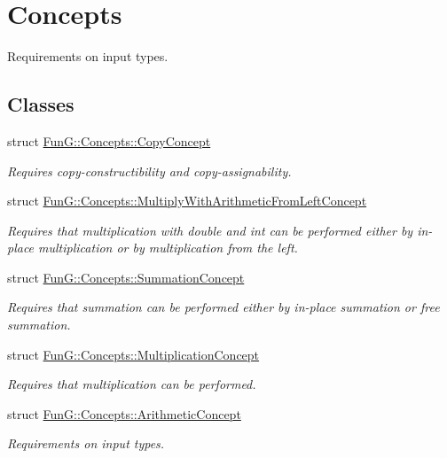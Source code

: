 \hypertarget{group__ConceptGroup}{\section{\-Concepts}
\label{group__ConceptGroup}
}


\-Requirements on input types.  


\subsection*{\-Classes}
\begin{DoxyCompactItemize}
\item 
struct \hyperlink{structFunG_1_1Concepts_1_1CopyConcept}{\-Fun\-G\-::\-Concepts\-::\-Copy\-Concept}
\begin{DoxyCompactList}\small\item\em \-Requires copy-\/constructibility and copy-\/assignability. \end{DoxyCompactList}\item 
struct \hyperlink{structFunG_1_1Concepts_1_1MultiplyWithArithmeticFromLeftConcept}{\-Fun\-G\-::\-Concepts\-::\-Multiply\-With\-Arithmetic\-From\-Left\-Concept}
\begin{DoxyCompactList}\small\item\em \-Requires that multiplication with double and int can be performed either by in-\/place multiplication or by multiplication from the left. \end{DoxyCompactList}\item 
struct \hyperlink{structFunG_1_1Concepts_1_1SummationConcept}{\-Fun\-G\-::\-Concepts\-::\-Summation\-Concept}
\begin{DoxyCompactList}\small\item\em \-Requires that summation can be performed either by in-\/place summation or free summation. \end{DoxyCompactList}\item 
struct \hyperlink{structFunG_1_1Concepts_1_1MultiplicationConcept}{\-Fun\-G\-::\-Concepts\-::\-Multiplication\-Concept}
\begin{DoxyCompactList}\small\item\em \-Requires that multiplication can be performed. \end{DoxyCompactList}\item 
struct \hyperlink{structFunG_1_1Concepts_1_1ArithmeticConcept}{\-Fun\-G\-::\-Concepts\-::\-Arithmetic\-Concept}
\begin{DoxyCompactList}\small\item\em \-Requirements on input types. \end{DoxyCompactList}\item 

\end{DoxyCompactItemize}
